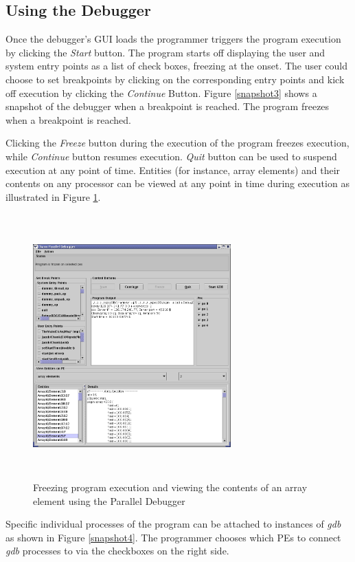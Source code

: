 \documentclass[10pt,dvips]{article}
\begin{document}
\subsection{Using the Debugger}


Once the debugger's GUI loads the programmer triggers the program
execution by clicking the \textit{Start} button.  The program starts
off displaying the user and system entry points as a list of check
boxes, freezing at the onset. The user could choose to set breakpoints
by clicking on the corresponding entry points and kick off execution
by clicking the \textit{Continue} Button. Figure \ref{snapshot3} shows
a snapshot of the debugger when a breakpoint is reached. The program
freezes when a breakpoint is reached.

 
Clicking the \textit{Freeze} button during the execution of the program freezes execution, while
\textit{Continue} button resumes execution. \textit{Quit} button can be used to suspend execution
at any point of time. Entities (for instance, array elements) and their contents on any processor 
can be viewed at any point in time during execution as illustrated in Figure \ref{arrayelement}.

\begin{figure}[]
\includegraphics[scale=0.5, height=4in,width=3in]{figs/arrayelement}
\caption{Freezing program execution and viewing the contents of an array element using the Parallel Debugger}
\label{arrayelement}
\end{figure} 

Specific individual processes of the \charmpp{} program can be attached to instances of \textit{gdb} 
as shown in Figure \ref{snapshot4}.  The programmer chooses which PEs to connect \textit{gdb} processes to via the checkboxes on the right side.  
\end{document}
